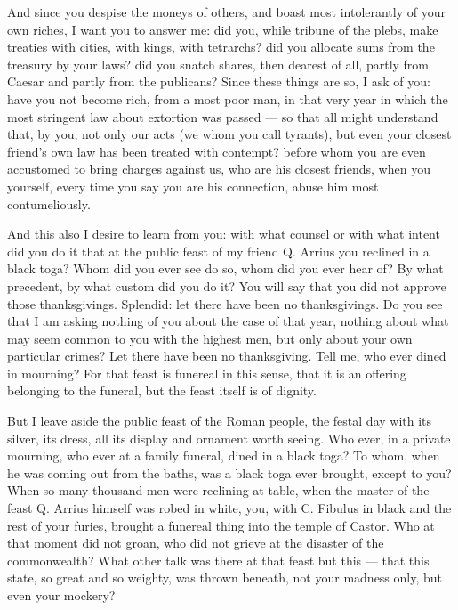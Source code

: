  And since you despise the moneys of others, and boast most intolerantly of your own riches, I want you to answer me: did you, while tribune of the plebs, make treaties with cities, with kings, with tetrarchs? did you allocate sums from the treasury by your laws? did you snatch shares, then dearest of all, partly from Caesar and partly from the publicans? Since these things are so, I ask of you: have you not become rich, from a most poor man, in that very year in which the most stringent law about extortion was passed --- so that all might understand that, by you, not only our acts (we whom you call tyrants), but even your closest friend's own law has been treated with contempt? before whom you are even accustomed to bring charges against us, who are his closest friends, when you yourself, every time you say you are his connection, abuse him most contumeliously.

 And this also I desire to learn from you: with what counsel or with what intent did you do it that at the public feast of my friend Q. Arrius you reclined in a black toga? Whom did you ever see do so, whom did you ever hear of? By what precedent, by what custom did you do it? You will say that you did not approve those thanksgivings. Splendid: let there have been no thanksgivings. Do you see that I am asking nothing of you about the case of that year, nothing about what may seem common to you with the highest men, but only about your own particular crimes? Let there have been no thanksgiving. Tell me, who ever dined in mourning? For that feast is funereal in this sense, that it is an offering belonging to the funeral, but the feast itself is of dignity.

 But I leave aside the public feast of the Roman people, the festal day with its silver, its dress, all its display and ornament worth seeing. Who ever, in a private mourning, who ever at a family funeral, dined in a black toga? To whom, when he was coming out from the baths, was a black toga ever brought, except to you? When so many thousand men were reclining at table, when the master of the feast Q. Arrius himself was robed in white, you, with C. Fibulus in black and the rest of your furies, brought a funereal thing into the temple of Castor. Who at that moment did not groan, who did not grieve at the disaster of the commonwealth? What other talk was there at that feast but this --- that this state, so great and so weighty, was thrown beneath, not your madness only, but even your mockery?

